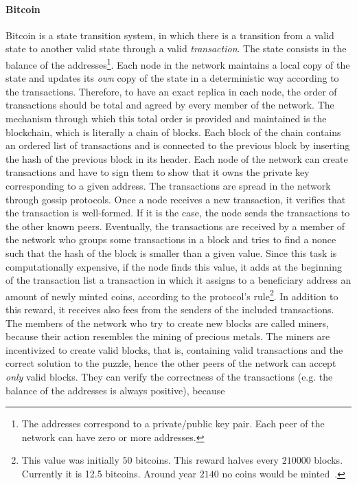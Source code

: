 \paragraph{Bitcoin}
Bitcoin is a state transition system, in which there is a transition from a
valid state to another valid state through a valid \emph{transaction}. The state
consists in the balance of the addresses\footnote{The addresses correspond to a
private/public key pair. Each peer of the network can have zero or more
addresses.}. Each node in the network maintains a local copy of the state and
updates its \emph{own} copy of the state in a deterministic way according to the
transactions. Therefore, to have an exact replica in each node, the order of
transactions should be total and agreed by every member of the network. The
mechanism through which this total order is provided and maintained is the
blockchain, which is literally a chain of blocks. Each block of the chain
contains an ordered list of transactions and is connected to the previous block
by inserting the hash of the previous block in its header. Each node of the
network can create transactions and have to sign them to show that it owns the
private key corresponding to a given address. The transactions are spread in the
network through gossip protocols. Once a node receives a new transaction, it
verifies that the transaction is well-formed. If it is the case, the node sends
the transactions to the other known peers. Eventually, the transactions are
received by a member of the network who groups some transactions in a block and
tries to find a nonce such that the hash of the block is smaller than a given
value. Since this task is computationally expensive, if the node finds this
value, it adds at the beginning of the transaction list a transaction in which
it assigns to a beneficiary address an amount of newly minted coins, according
to the protocol's rule\footnote{This value was initially $50$ bitcoins. This
reward halves every $210000$ blocks. Currently it is 12.5 bitcoins. Around year
$2140$ no coins would be minted~\cite{bib:masteringbitcoin}.}. In addition to
this reward, it receives also fees from the senders of the included
transactions. The members of the network who try to create new blocks are called
miners, because their action resembles the mining of precious metals. The miners
are incentivized to create valid blocks, that is, containing valid transactions
and the correct solution to the puzzle, hence the other peers of the network can
accept \emph{only} valid blocks. They can verify the correctness of the
transactions (e.g. the balance of the addresses is always positive), because
